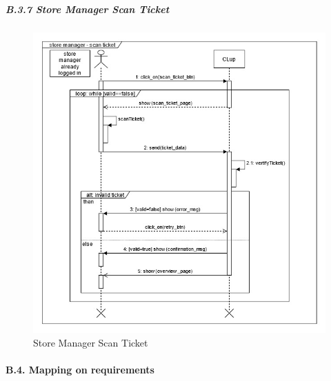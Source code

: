 \documentclass[
]{article}
\begin{document}
\hypertarget{b.3.7-store-manager-scan-ticket}{%
\subparagraph{\texorpdfstring{B.3.7 Store Manager Scan Ticket
}{B.3.7 Store Manager Scan Ticket }}\label{b.3.7-store-manager-scan-ticket}}

\begin{figure}
\centering
\includegraphics{assets/rasd/sequence_diagrams/sequence_diagram_store_manager_scan_ticket.jpg}
\caption{Store Manager Scan Ticket}
\end{figure}

\hypertarget{b.4.-mapping-on-requirements}{%
\paragraph{B.4. Mapping on
requirements}\label{b.4.-mapping-on-requirements}}
\end{document}
